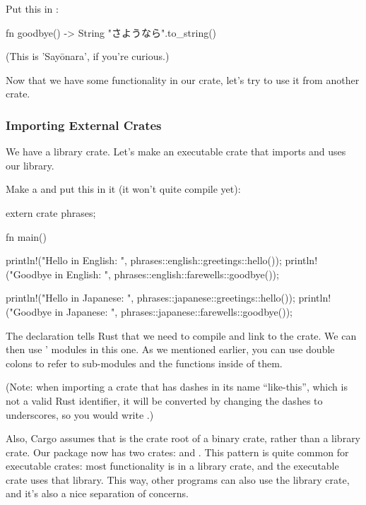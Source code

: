 Put this in :

\begin{rustc}
fn goodbye() -> String {
    "さようなら".to_string()
}
\end{rustc}

(This is 'Sayōnara', if you're curious.)

\blank

Now that we have some functionality in our crate, let's try to use it from another crate.

\subsubsection*{Importing External Crates}

We have a library crate. Let's make an executable crate that imports and uses our library.

\blank

Make a  and put this in it (it won't quite compile yet):

\begin{rustc}
extern crate phrases;

fn main() {
    println!("Hello in English: {}", phrases::english::greetings::hello());
    println!("Goodbye in English: {}", phrases::english::farewells::goodbye());

    println!("Hello in Japanese: {}", phrases::japanese::greetings::hello());
    println!("Goodbye in Japanese: {}", phrases::japanese::farewells::goodbye());
}
\end{rustc}

The  declaration tells Rust that we need to compile and link to the  crate. We can then use ' 
modules in this one. As we mentioned earlier, you can use double colons to refer to sub-modules and the functions inside of them.

\blank

(Note: when importing a crate that has dashes in its name \enquote{like-this}, which is not a valid Rust identifier, it will be 
converted by changing the dashes to underscores, so you would write .)

\blank

Also, Cargo assumes that  is the crate root of a binary crate, rather than a library crate. Our package now has two 
crates:  and . This pattern is quite common for executable crates: most functionality is in a library 
crate, and the executable crate uses that library. This way, other programs can also use the library crate, and it's also a nice separation 
of concerns.


